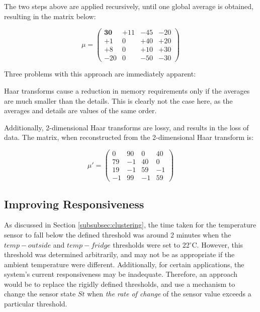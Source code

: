 \documentclass{sig-alternate-10pt}
\begin{document}
The two steps above are applied recursively, until one global average is obtained, resulting in the matrix below:


\begin{equation*}
\mu = \left( \begin{array}{cccc}
\textbf{30} & +11 & -45 & -20 \\
+1 & 0 & +40 & +20 \\
+8 & 0 & +10 & +30 \\
-20 & 0 & -50 & -30 \end{array}
 \right) 
\end{equation*}

Three problems with this approach are immediately apparent:
\begin{compactitem}
 \item Haar transforms cause a reduction in memory requirements only if the averages are much smaller than the details. This is clearly not the case here, as the averages and details are values of the same order.

\item Additionally, 2-dimensional Haar transforms are lossy, and results in the loss of data. The matrix, when reconstructed from the 2-dimensional Haar transform is:

\begin{equation*}
\mu ' = \left( \begin{array}{cccc}
0 & 90 & 0 & 40 \\
79 & -1 & 40 & 0 \\
19 & -1 & 59 & -1 \\
-1 & 99 &-1 & 59 \end{array}
 \right)
\end{equation*}

\end{compactitem}

\subsection{Improving Responsiveness}

As discussed in Section \ref{subsubsec:clustering}, the time taken for the temperature sensor to fall below the defined threshold was around 2 minutes when the $temp-outside$ and $temp-fridge$ thresholds were set to 22$^\circ$C. However, this threshold was determined arbitrarily, and may not be as appropriate if the ambient temperature were different. Additionally, for certain applications, the system's current responsiveness may be inadequate. Therefore, an approach would be to replace the rigidly defined thresholds, and use a mechanism to change the sensor state $St$ when \emph{the rate of change} of the sensor value exceeds a particular threshold.
\end{document}
